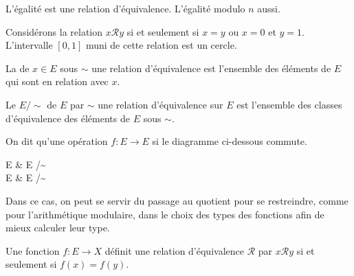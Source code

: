\documentclass[info, math]{mpb-cours}
\begin{document}
L'égalité est une relation d'équivalence. L'égalité modulo $n$ aussi.

\begin{proposition}
	Considérons la relation $x \mathcal{R} y$ si et seulement si $x = y$ ou $x = 0$ et $y = 1$.
	L'intervalle $[0, 1]$ muni de cette relation est un cercle.

\end{proposition}

\begin{definition}
	La  de $x \in E$ sous $\sim$ une relation d'équivalence est l'ensemble des
	éléments de $E$ qui sont en relation avec $x$.

	Le  $E / \sim$ de $E$ par $\sim$ une relation d'équivalence sur $E$ est l'ensemble des
	classes d'équivalence des éléments de $E$ sous $\sim$.
\end{definition}

\begin{definition}
	On dit qu'une opération $f: E \to E$  si le diagramme ci-dessous commute.
	\begin{category}
		E \ar[r, "/\sim"]\ar[d, "f"'] & E /\sim\ar[d, "f"]\\
		E \ar[r, "/\sim"'] & E /\sim
	\end{category}
\end{definition}

Dans ce cas, on peut se servir du passage au quotient pour se restreindre, comme pour l'arithmétique
modulaire, dans le choix des types des fonctions afin de mieux calculer leur type.

\begin{proposition}
	Une fonction $f: E \to X$ définit une relation d'équivalence $\mathcal{R}$ par $x \mathcal{R} y$
	si et seulement si $f(x) = f(y)$.
\end{proposition}
\end{document}

